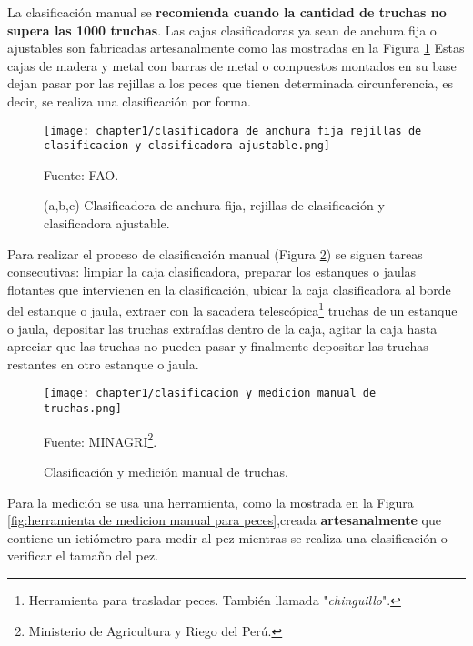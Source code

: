 La clasificación manual se \textbf{recomienda cuando la cantidad de truchas no supera las 1000 truchas}.\cite[p.~25]{FAO2014} Las cajas clasificadoras ya sean de anchura fija o ajustables son fabricadas artesanalmente como las mostradas en la Figura \ref{fig:clasificadora de anchura fija rejillas de clasificacion y clasificadora ajustable} Estas cajas de madera y metal con barras de metal o compuestos montados en su base dejan pasar por las rejillas a los peces que tienen determinada circunferencia, es decir, se realiza una clasificación por forma.\cite{FAO2005}\\

\begin{figure}[H]
	\centering
	\texttt{[image: chapter1/clasificadora de anchura fija rejillas de clasificacion y clasificadora ajustable.png]}
	\caption{(a,b,c) Clasificadora de anchura fija, rejillas de clasificación y clasificadora ajustable.}
	Fuente: FAO.
	\label{fig:clasificadora de anchura fija rejillas de clasificacion y clasificadora ajustable}
\end{figure}

Para realizar el proceso de clasificación manual (Figura \ref{fig:clasificacion y medicion manual de truchas}) se siguen tareas consecutivas: limpiar la caja clasificadora, preparar los estanques o jaulas flotantes que intervienen en la clasificación, ubicar la caja clasificadora al borde del estanque o jaula, extraer con la sacadera telescópica\footnote{Herramienta para trasladar peces. También llamada "\textit{chinguillo}".} truchas de un estanque o jaula, depositar las truchas extraídas dentro de la caja, agitar la caja hasta apreciar que las truchas no pueden pasar y finalmente depositar las truchas restantes en otro estanque o jaula.\\

\begin{figure}[H]
	\centering
	\texttt{[image: chapter1/clasificacion y medicion manual de truchas.png]}
	\caption{Clasificación y medición manual de truchas.}
	Fuente: MINAGRI\footnote{Ministerio de Agricultura y Riego del Perú.}.
	\label{fig:clasificacion y medicion manual de truchas}
\end{figure}

Para la medición se usa una herramienta, como la mostrada en la Figura \ref{fig:herramienta de medicion manual para peces},creada \textbf{artesanalmente} que contiene un ictiómetro para medir al pez mientras se realiza una clasificación o verificar el tamaño del pez. \\

